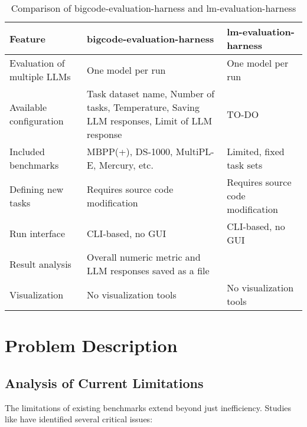\begin{table}[h]
\centering
\begin{tabular}{|p{4cm}|p{5cm}|p{5cm}|}
  \hline
        \textbf{Feature} & \textbf{bigcode-evaluation-harness} & \textbf{lm-evaluation-harness} \\
        \hline
        Evaluation of multiple LLMs & One model per run & One model per run \\
        \hline
        Available configuration & Task dataset name, Number of tasks, Temperature, Saving LLM responses, Limit of LLM response & TO-DO \\
        \hline
        Included benchmarks & MBPP(+), DS-1000, MultiPL-E, Mercury, etc. & Limited, fixed task sets \\
        \hline
        Defining new tasks & Requires source code modification & Requires source code modification \\
        \hline
        Run interface & CLI-based, no GUI & CLI-based, no GUI \\
        \hline
        Result analysis & Overall numeric metric and LLM responses saved as a file &  \\
        \hline
        Visualization & No visualization tools & No visualization tools \\
        \hline
    \end{tabular}
    \caption{Comparison of bigcode-evaluation-harness and lm-evaluation-harness}
    \label{tab:framework-comparison}
\end{table}

\chapter{Problem Description}

\section{Analysis of Current Limitations}

The limitations of existing benchmarks extend beyond just inefficiency. Studies like  have identified several critical issues:

